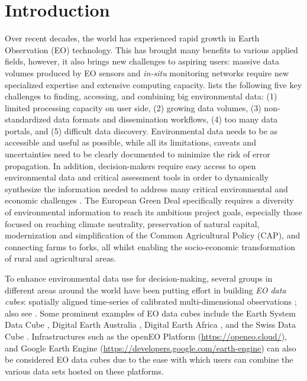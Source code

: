 \newpage

\section{Introduction}

Over recent decades, the world has experienced rapid growth in Earth Observation (EO) technology. This has brought many benefits to various applied fields, however, it also brings new challenges to aspiring users: massive data volumes produced by EO sensors and \emph{in-situ} monitoring networks require new specialized expertise and extensive computing capacity. \citet{wagemann2021a} lists the following five key challenges to finding, accessing, and combining big environmental data: (1) limited processing capacity on user side, (2) growing data volumes, (3) non-standardized data formats and dissemination workflows, (4) too many data portals, and (5) difficult data discovery. Environmental data needs to be as accessible and useful as possible, while all its limitations, caveats and uncertainties need to be clearly documented to minimize the risk of error propagation. In addition, decision-makers require easy access to open environmental data and critical assessment tools in order to dynamically synthesize the information needed to address many critical environmental and economic challenges \citep{giuliani2017building}. The European Green Deal specifically \citep{sikora2021european} requires a diversity of environmental information to reach its ambitious project goals, especially those focused on reaching climate neutrality, preservation of natural capital, modernization and simplification of the Common Agricultural Policy (CAP), and connecting farms to forks, all whilst enabling the socio-economic transformation of rural and agricultural areas. 

To enhance environmental data use for decision-making, several groups in different areas around the world have been putting effort in building \emph{EO data cubes}: spatially aligned time-series of calibrated multi-dimensional observations \citep{giuliani2017building}; also see \citet{lu2018multidimensional, liu2021production, mirmazloumi2022elulc}. Some prominent examples of EO data cubes include the Earth System Data Cube \citep{mahecha2020earth}, Digital Earth Australia \citep{lucas2019land}, Digital Earth Africa \citep{Fang2021}, and the Swiss Data Cube \citep{chatenoux2021swiss}. Infrastructures such as the openEO Platform (\url{https://openeo.cloud/}), and Google Earth Engine (\url{https://developers.google.com/earth-engine}) can also be considered EO data cubes \citep{giuliani2020data} due to the ease with which users can combine the various data sets hosted on these platforms.

